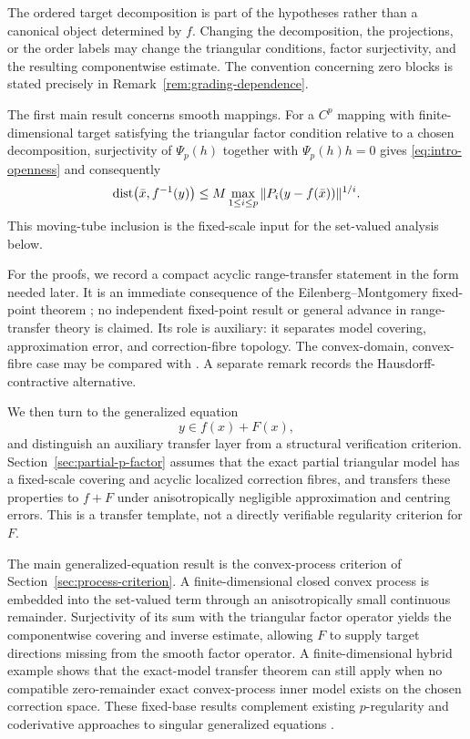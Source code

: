 \documentclass[11pt]{amsart}
\theoremstyle{definition}
\theoremstyle{remark}
\newcommand{\bx}{\bar x}
\newcommand{\dist}{\mathop{\rm dist}\nolimits}
\begin{document}
	The ordered target decomposition is part of the hypotheses rather than a
	canonical object determined by $f$. Changing the decomposition, the
	projections, or the order labels may change the triangular conditions,
	factor surjectivity, and the resulting componentwise estimate. The convention
	concerning zero blocks is stated precisely in
	Remark~\ref{rem:grading-dependence}.
	
	The first main result concerns smooth mappings. For a $C^p$
	mapping with finite-dimensional target satisfying the triangular factor
	condition relative to a chosen decomposition, surjectivity of $\Psi_p(h)$
	together with $\Psi_p(h)h=0$ gives \eqref{eq:intro-openness}
	and consequently
	$$
	\dist\bigl(\bx,f^{-1}(y)\bigr)
	\le M\max_{1\le i\le p}
	\|P_i(y-f(\bx))\|^{1/i}.
	$$
	This moving-tube inclusion is the fixed-scale input for the set-valued
	analysis below.
	
	
	For the proofs, we record a compact acyclic range-transfer statement in the
	form needed later.  It is an immediate consequence of the
	Eilenberg--Montgomery fixed-point theorem \cite{EilenbergMontgomery}; no
	independent fixed-point result or general advance in range-transfer theory
	is claimed.  Its role is auxiliary: it separates model covering,
	approximation error, and correction-fibre topology.  The convex-domain,
	convex-fibre case may be compared with
	\cite[Theorem~2.1]{CibulkaRoubalSetValued}.  A separate remark records the
	Hausdorff-contractive alternative.
	
	We then turn to the generalized equation
	$$
	y\in f(x)+F(x),
	$$
	and distinguish an auxiliary transfer layer from a structural verification
	criterion. Section~\ref{sec:partial-p-factor} assumes that the exact partial
	triangular model has a fixed-scale covering and acyclic localized correction
	fibres, and transfers these properties to $f+F$ under anisotropically
	negligible approximation and centring errors. This is a transfer template,
	not a directly verifiable regularity criterion for $F$.
	
	The main generalized-equation result is the convex-process criterion of
	Section~\ref{sec:process-criterion}. A finite-dimensional closed convex
	process is embedded into the set-valued term through an anisotropically
	small continuous remainder. Surjectivity of its sum with the triangular
	factor operator yields the componentwise covering and inverse estimate,
	allowing $F$ to supply target directions missing from the smooth factor
	operator. A finite-dimensional hybrid example shows that the exact-model transfer
	theorem can still apply when no compatible zero-remainder exact
	convex-process inner model exists on the chosen correction space. These
	fixed-base results complement
	existing $p$-regularity and coderivative approaches to singular generalized
	equations
	\cite{BednarczukPrusinskaTretyakov,ChuongPositiveOrderGE}.
	
\end{document}
